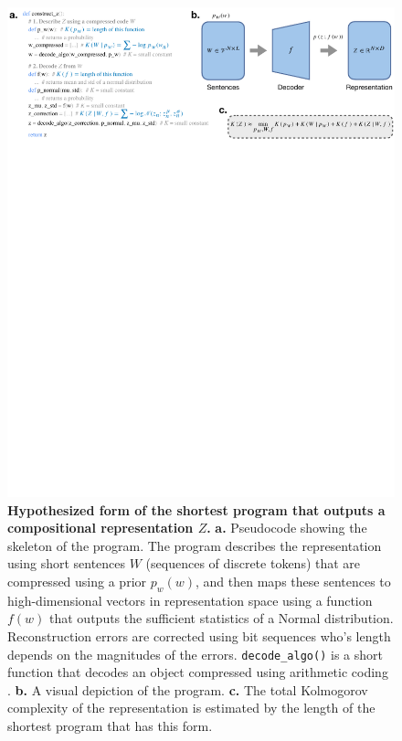 \documentclass{article}
\begin{document}
\begin{figure}[ht]
    \centering
    \includegraphics[width=\linewidth]{figures/program_form.pdf}
    \caption{\textbf{Hypothesized form of the shortest program that outputs a compositional representation $Z$.} \textbf{a.} Pseudocode showing the skeleton of the program. The program describes the representation using short sentences $W$ (sequences of discrete tokens) that are compressed using a prior $p_w(w)$, and then maps these sentences to high-dimensional vectors in representation space using a function $f(w)$ that outputs the sufficient statistics of a Normal distribution. Reconstruction errors are corrected using bit sequences who's length depends on the magnitudes of the errors. \texttt{decode\_algo()} is a short function that decodes an object compressed using arithmetic coding \citep{witten1987arithmetic}. \textbf{b.} A visual depiction of the program. \textbf{c.} The total Kolmogorov complexity of the representation is estimated by the length of the shortest program that has this form.}
    \label{fig:program_form}
\end{figure}
\end{document}
